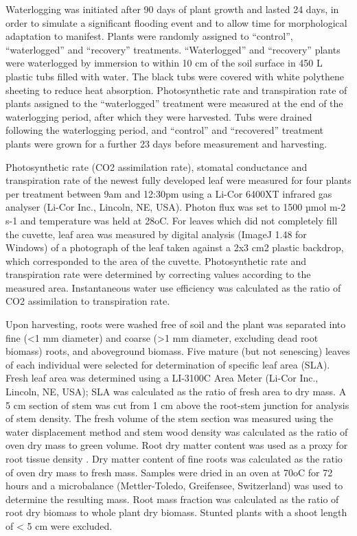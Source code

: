 \documentclass[12pt,a4paper]{memoir}
\begin{document}
Waterlogging was initiated after 90 days of plant growth and lasted 24 days, in order to simulate a significant flooding event and to allow time for morphological adaptation to manifest. Plants were randomly assigned to “control”, “waterlogged” and “recovery” treatments. “Waterlogged” and “recovery” plants were waterlogged by immersion to within 10 cm of the soil surface in 450 L plastic tubs filled with water. The black tubs were covered with white polythene sheeting to reduce heat absorption. Photosynthetic rate and transpiration rate of plants assigned to the “waterlogged” treatment were measured at the end of the waterlogging period, after which they were harvested. Tubs were drained following the waterlogging period, and “control” and “recovered” treatment plants were grown for a further 23 days before measurement and harvesting.

Photosynthetic rate (CO2 assimilation rate), stomatal conductance and transpiration rate of the newest fully developed leaf were measured for four plants per treatment between 9am and 12:30pm using a Li-Cor 6400XT infrared gas analyser (Li-Cor Inc., Lincoln, NE, USA). Photon flux was set to 1500 µmol m-2 s-1 and temperature was held at 28oC. For leaves which did not completely fill the cuvette, leaf area was measured by digital analysis (ImageJ 1.48 for Windows) of a photograph of the leaf taken against a 2x3 cm2 plastic backdrop, which corresponded to the area of the cuvette. Photosynthetic rate and transpiration rate were determined by correcting values according to the measured area. Instantaneous water use efficiency was calculated as the ratio of CO2 assimilation to transpiration rate.

Upon harvesting, roots were washed free of soil and the plant was separated into fine (<1 mm diameter) and coarse (>1 mm diameter, excluding dead root biomass) roots, and aboveground biomass. Five mature (but not senescing) leaves of each individual were selected for determination of specific leaf area (SLA). Fresh leaf area was determined using a LI-3100C Area Meter (Li-Cor Inc., Lincoln, NE, USA); SLA was calculated as the ratio of fresh area to dry mass.  A 5 cm section of stem was cut from 1 cm above the root-stem junction for analysis of stem density. The fresh volume of the stem section was measured using the water displacement method and stem wood density was calculated as the ratio of oven dry mass to green volume. Root dry matter content was used as a proxy for root tissue density \cite{Birouste2013}. Dry matter content of fine roots was calculated as the ratio of oven dry mass to fresh mass. Samples were dried in an oven at 70oC for 72 hours and a microbalance (Mettler-Toledo, Greifensee, Switzerland) was used to determine the resulting mass. Root mass fraction was calculated as the ratio of root dry biomass to whole plant dry biomass. Stunted plants with a shoot length of < 5 cm were excluded.
\end{document}
